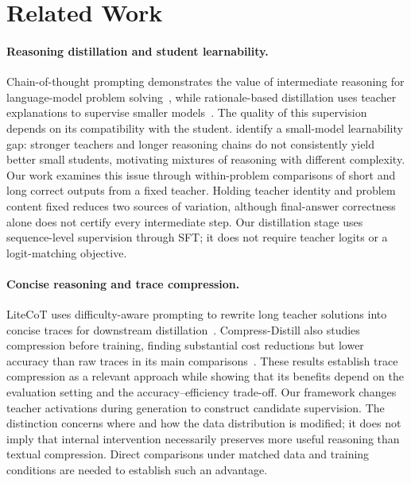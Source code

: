 \section{Related Work}
\label{sec:related_work}

\paragraph{Reasoning distillation and student learnability.}
Chain-of-thought prompting demonstrates the value of intermediate reasoning for language-model problem solving~\citep{wei2022chain}, while rationale-based distillation uses teacher explanations to supervise smaller models~\citep{hsieh2023distilling}.
The quality of this supervision depends on its compatibility with the student.
\citet{li2025small} identify a small-model learnability gap: stronger teachers and longer reasoning chains do not consistently yield better small students, motivating mixtures of reasoning with different complexity.
Our work examines this issue through within-problem comparisons of short and long correct outputs from a fixed teacher.
Holding teacher identity and problem content fixed reduces two sources of variation, although final-answer correctness alone does not certify every intermediate step.
Our distillation stage uses sequence-level supervision through SFT; it does not require teacher logits or a logit-matching objective.

\paragraph{Concise reasoning and trace compression.}
LiteCoT uses difficulty-aware prompting to rewrite long teacher solutions into concise traces for downstream distillation~\citep{wu2025concise}.
Compress-Distill also studies compression before training, finding substantial cost reductions but lower accuracy than raw traces in its main comparisons~\citep{griot2026compress}.
These results establish trace compression as a relevant approach while showing that its benefits depend on the evaluation setting and the accuracy--efficiency trade-off.
Our framework changes teacher activations during generation to construct candidate supervision.
The distinction concerns where and how the data distribution is modified; it does not imply that internal intervention necessarily preserves more useful reasoning than textual compression.
Direct comparisons under matched data and training conditions are needed to establish such an advantage.

